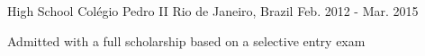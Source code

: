   \cventry
    {High School} %
    {Colégio Pedro II} %
    {Rio de Janeiro, Brazil} %
    {Feb. 2012 - Mar. 2015} %
    {
      \begin{cvitems} %
        \item {Admitted with a full scholarship based on a selective entry exam}
      \end{cvitems}
    }

